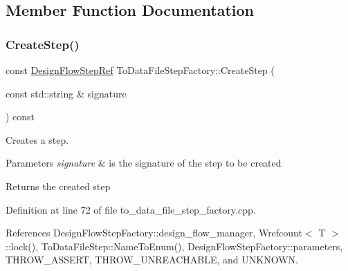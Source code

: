 \subsection{Member Function Documentation}
\mbox{\label{classToDataFileStepFactory_a851d4679d80e2a754f3adacaa91d9def}} 
\subsubsection{\texorpdfstring{Create\+Step()}{CreateStep()}}
{\footnotesize\ttfamily const \hyperlink{design__flow__step_8hpp_a9dd6b4474ddf52d41a78b1aaa12ae6c8}{Design\+Flow\+Step\+Ref} To\+Data\+File\+Step\+Factory\+::\+Create\+Step (\begin{DoxyParamCaption}\item[{const std\+::string \&}]{signature }\end{DoxyParamCaption}) const}



Creates a step. 


\begin{DoxyParams}{Parameters}
{\em signature} & is the signature of the step to be created \\
\hline
\end{DoxyParams}
\begin{DoxyReturn}{Returns}
the created step 
\end{DoxyReturn}


Definition at line 72 of file to\+\_\+data\+\_\+file\+\_\+step\+\_\+factory.\+cpp.



References Design\+Flow\+Step\+Factory\+::design\+\_\+flow\+\_\+manager, Wrefcount$<$ T $>$\+::lock(), To\+Data\+File\+Step\+::\+Name\+To\+Enum(), Design\+Flow\+Step\+Factory\+::parameters, T\+H\+R\+O\+W\+\_\+\+A\+S\+S\+E\+RT, T\+H\+R\+O\+W\+\_\+\+U\+N\+R\+E\+A\+C\+H\+A\+B\+LE, and U\+N\+K\+N\+O\+WN.

